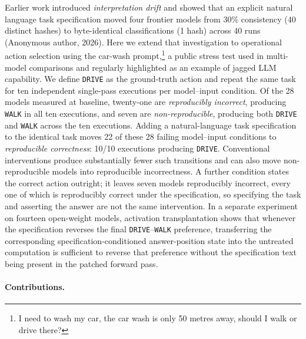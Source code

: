 Earlier work introduced \emph{interpretation drift} and showed that an explicit natural language task specification moved four frontier models from $30\%$ consistency (40 distinct hashes) to byte-identical
classifications (1 hash) across 40 runs
(Anonymous author, 2026). Here we extend that investigation to operational action selection using the car-wash prompt,\footnote{I need to wash my car, the car wash
is only 50 metres away, should I walk or drive there?} a public stress test used in multi-model comparisons and regularly highlighted as an example of jagged LLM capability. We define \texttt{DRIVE} as the ground-truth action and repeat the same task for ten independent single-pass executions per model--input condition. Of the 28 models measured at baseline, twenty-one are \emph{reproducibly incorrect}, producing \texttt{WALK} in all ten executions, and seven are \emph{non-reproducible}, producing both \texttt{DRIVE} and \texttt{WALK} across
the ten executions. Adding a natural-language task specification to the identical task moves 22 of these 28 failing model--input conditions to \emph{reproducible correctness}: 10/10 executions producing \texttt{DRIVE}. Conventional interventions produce substantially fewer such transitions and can also move non-reproducible models into reproducible incorrectness. A further condition states the correct action outright; it leaves seven models reproducibly incorrect, every one of which is reproducibly correct under the specification, so specifying the task and asserting the answer are not the same intervention. In a separate experiment on fourteen open-weight models, activation transplantation shows that whenever the specification reverses the final \texttt{DRIVE}--\texttt{WALK} preference, transferring the corresponding
specification-conditioned answer-position state into the untreated computation is sufficient to reverse that preference without the specification text being present
in the patched forward pass.

\paragraph{Contributions.}

